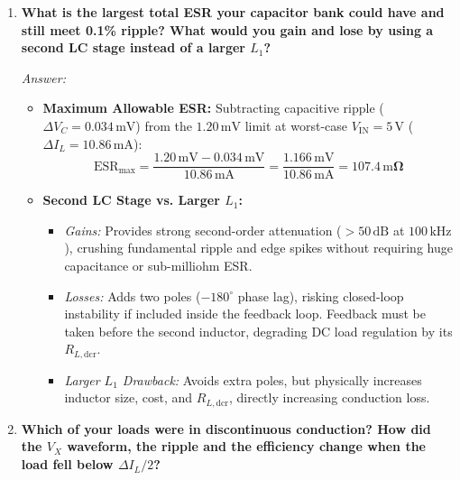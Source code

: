 \documentclass[12pt,a4paper]{article}
\newcommand{\Vin}{V_{\mathrm{IN}}}
\newcommand{\Vx}{V_X}
\newcommand{\dI}{\Delta I_L}
\newcommand{\DCR}{R_{L,\mathrm{dcr}}}
\newcommand{\ESR}{\mathrm{ESR}}
\begin{document}
\begin{enumerate}[leftmargin=1.8em, label=\textbf{Q\arabic*.}, itemsep=1.0em]
    \item \textbf{What is the largest total ESR your capacitor bank could have and still meet 0.1\% ripple? What would you gain and lose by using a second LC stage instead of a larger $L_1$?}
    
    \emph{Answer:}
    \begin{itemize}[itemsep=2pt, topsep=2pt]
        \item \textbf{Maximum Allowable ESR:} Subtracting capacitive ripple ($\Delta V_C = 0.034\,\mathrm{mV}$) from the $1.20\,\mathrm{mV}$ limit at worst-case $\Vin = 5\,\mathrm{V}$ ($\dI = 10.86\,\mathrm{mA}$):
        \begin{equation*}
            \ESR_{\mathrm{max}} = \frac{1.20\,\mathrm{mV} - 0.034\,\mathrm{mV}}{10.86\,\mathrm{mA}} = \frac{1.166\,\mathrm{mV}}{10.86\,\mathrm{mA}} = \mathbf{107.4\,\mathrm{m}\Omega}
        \end{equation*}
        \item \textbf{Second LC Stage vs. Larger $L_1$:}
        \begin{itemize}[itemsep=2pt]
            \item \emph{Gains:} Provides strong second-order attenuation ($>50\,\mathrm{dB}$ at $100\,\mathrm{kHz}$), crushing fundamental ripple and edge spikes without requiring huge capacitance or sub-milliohm ESR.
            \item \emph{Losses:} Adds two poles ($-180^\circ$ phase lag), risking closed-loop instability if included inside the feedback loop. Feedback must be taken before the second inductor, degrading DC load regulation by its $\DCR$.
            \item \emph{Larger $L_1$ Drawback:} Avoids extra poles, but physically increases inductor size, cost, and $\DCR$, directly increasing conduction loss.
        \end{itemize}
    \end{itemize}

    \item \textbf{Which of your loads were in discontinuous conduction? How did the $\Vx$ waveform, the ripple and the efficiency change when the load fell below $\dI / 2$?}
    

\end{enumerate}
\end{document}
